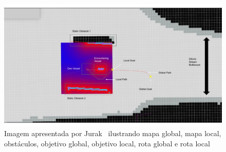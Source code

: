        \begin{figure}
           \centering
           \includegraphics[scale=0.65]{fig/chap3/costmaps.pdf}
           \caption{Imagem apresentada por Jurak~\cite{Jurak2020COLREGS} ilustrando mapa global, mapa local, obstáculos, objetivo global, objetivo local, rota global e rota local}
           \label{fig:chap3_sistema_base_costmaps}
       \end{figure}